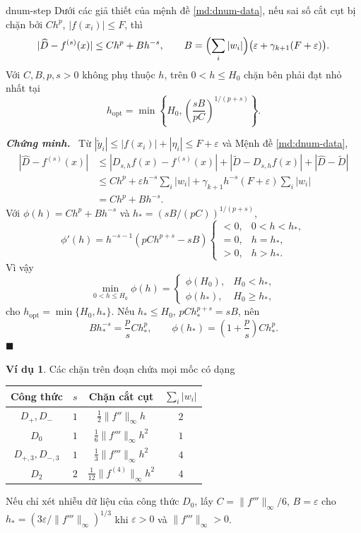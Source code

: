 \documentclass[12pt,a4paper,oneside]{book}
\numberwithin{algorithm}{chapter}
\theoremstyle{definition}
\newtheorem{vidu}{Ví dụ}[chapter]
\newenvironment{chungminh}{\par\medskip\noindent\textbf{\textit{\color{mainblue}Chứng minh.}}\ }{\hfill$\blacksquare$\par\medskip}
\begin{document}
\begin{menhde}{}{dnum-step}
Dưới các giả thiết của mệnh đề \ref{md:dnum-data}, nếu sai số cắt cụt bị chặn bởi $Ch^p$, $|f(x_i)|\leq F$, thì
\[
 |\widehat D-f^{(s)}(x)|\leq Ch^p+Bh^{-s},\qquad
 B=\Bigl(\sum_i|w_i|\Bigr)\bigl(\varepsilon+\gamma_{k+1}(F+\varepsilon)\bigr).
\]
Với $C,B,p,s>0$ không phụ thuộc $h$, trên $0<h\leq H_0$ chặn bên phải đạt nhỏ nhất tại
\[
 h_{\mathrm{opt}}=\min\left\{H_0,\left(\frac{sB}{pC}\right)^{1/(p+s)}\right\}.
\]
\end{menhde}
\begin{chungminh}
Từ $|\widetilde y_i|\leq|f(x_i)|+|\eta_i|\leq F+\varepsilon$ và Mệnh đề \ref{md:dnum-data},
\begin{align*}
 |\widehat D-f^{(s)}(x)|
 &\leq|D_{s,h}f(x)-f^{(s)}(x)|+|\widetilde D-D_{s,h}f(x)|+|\widehat D-\widetilde D|\\
 &\leq Ch^p+\varepsilon h^{-s}\sum_i|w_i|
 +\gamma_{k+1}h^{-s}(F+\varepsilon)\sum_i|w_i|\\
 &=Ch^p+Bh^{-s}.
\end{align*}
Với $\phi(h)=Ch^p+Bh^{-s}$ và $h_*=(sB/(pC))^{1/(p+s)}$,
\[
 \phi'(h)=h^{-s-1}(pCh^{p+s}-sB)
 \begin{cases}<0,&0<h<h_*,\\=0,&h=h_*,\\>0,&h>h_* .\end{cases}
\]
Vì vậy
\[
 \min_{0<h\leq H_0}\phi(h)=
 \begin{cases}\phi(H_0),&H_0<h_*,\\\phi(h_*),&H_0\geq h_* ,\end{cases}
\]
cho $h_{\mathrm{opt}}=\min\{H_0,h_*\}$. Nếu $h_*\leq H_0$, $pCh_*^{p+s}=sB$, nên
\[
 Bh_*^{-s}=\frac psCh_*^p,\qquad
 \phi(h_*)=\left(1+\frac ps\right)Ch_*^p.
\]
\end{chungminh}

\begin{vidu}
Các chặn trên đoạn chứa mọi mốc có dạng
\begin{center}
\begin{tabular}{c|c|c|c}
\toprule
Công thức & $s$ & Chặn cắt cụt & $\sum_i|w_i|$\\
\midrule
$D_+,D_-$ & $1$ & $\frac12\lVert f''\rVert_\infty h$ & $2$\\
$D_0$ & $1$ & $\frac16\lVert f'''\rVert_\infty h^2$ & $1$\\
$D_{+,3},D_{-,3}$ & $1$ & $\frac13\lVert f'''\rVert_\infty h^2$ & $4$\\
$D_2$ & $2$ & $\frac1{12}\lVert f^{(4)}\rVert_\infty h^2$ & $4$\\
\bottomrule
\end{tabular}
\end{center}
Nếu chỉ xét nhiễu dữ liệu của công thức $D_0$, lấy $C=\lVert f'''\rVert_\infty/6$, $B=\varepsilon$ cho $h_*=(3\varepsilon/\lVert f'''\rVert_\infty)^{1/3}$ khi $\varepsilon>0$ và $\lVert f'''\rVert_\infty>0$.
\end{vidu}
\end{document}
